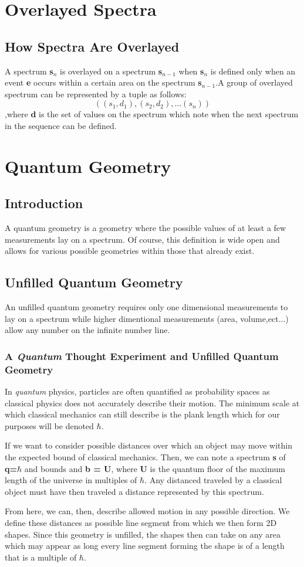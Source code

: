\documentclass[12pt]{scrreprt}
\begin{document}
\chapter{Overlayed Spectra}
\section{How Spectra Are Overlayed}
A spectrum \textbf{s$_n$} is overlayed on a spectrum \textbf{s$_{n-1}$} when  \textbf{s$_n$} is defined only when an event \textbf{e} occurs within a certain area on the spectrum \textbf{s$_{n-1}$}.A group of overlayed spectrum can be represented by a tuple as follows: 
   \begin{equation} ((s_1,d_1),(s_2,d_2),...(s_n))\end{equation},where \textbf{d} is the set of values on the spectrum which note when the next spectrum in the sequence can be defined.
\chapter{Quantum Geometry}
\section{Introduction}
A quantum geometry is a geometry where the possible values of at least a few measurements lay on a spectrum. Of course, this definition is wide open and allows for various possible geometries within those that already exist.
\section{Unfilled Quantum Geometry}
An unfilled quantum geometry requires only one dimensional measurements to lay on a spectrum while higher dimentional measurements (area, volume,ect...) allow any number on the infinite number line. 
\subsection{A \textit{Quantum} Thought Experiment and Unfilled Quantum Geometry}
In \textit{quantum} physics, particles are often quantified as probability spaces as classical physics does not accurately describe their motion. The minimum scale at which classical mechanics can still describe is the plank length which for our purposes will be denoted $\hbar$. 
\par If we want to consider possible distances over which an object may move within the expected bound of classical mechanics. Then, we can note a spectrum \textbf{s} of \textbf{q=$\hbar$} and bounds  and \textbf{b = U}, where \textbf{U} is the quantum floor of the maximum length of the universe in multiples of $\hbar$. Any distanced traveled by a classical object must have then traveled a distance represented by this spectrum. 
\par From here, we can, then, describe allowed motion in any possible direction. We define these distances as possible line segment from which we then form 2D shapes. Since this geometry is unfilled, the shapes then can take on any area which may appear as long every line segment forming the shape is of a length that is a multiple of $\hbar$.
\end{document}
